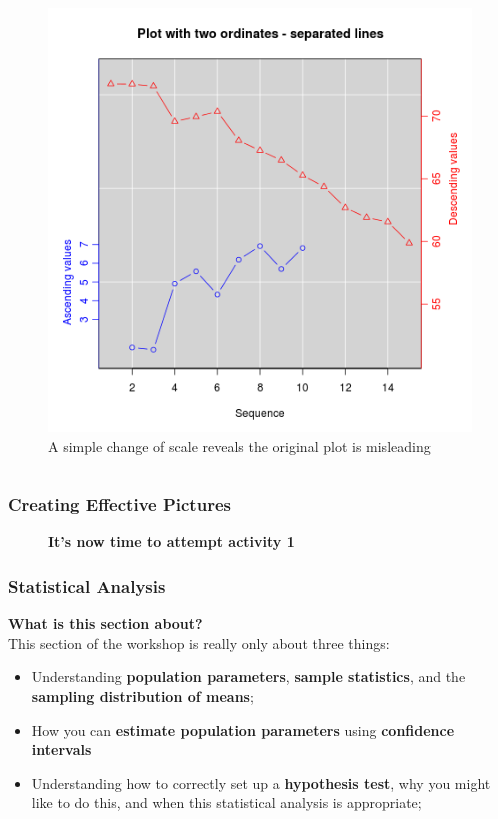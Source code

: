 \documentclass{beamer}
\begin{document}
\begin{frame}
\begin{columns}
\begin{figure}
\includegraphics[scale=0.2]{2plot_2}
\vspace{-0.3cm}
\caption{A simple change of scale reveals the original plot is misleading}
\end{figure}
\end{columns}
\end{frame}


\begin{frame}
\frametitle{Creating Effective Pictures}
\begin{figure}
\large\textbf{It's now time to attempt activity 1}
\end{figure}
\end{frame}

\begin{frame}
\frametitle{Statistical Analysis}
\textbf{What is this section about?}\\
\vspace{0.5cm}
This section of the workshop is really only about three things:
\vspace{0.4cm}
\begin{itemize}
\item Understanding \textbf{population parameters}, \textbf{sample statistics}, and the \textbf{sampling distribution of means};
\vspace{0.4cm}
\item How you can \textbf{estimate population parameters} using \textbf{confidence intervals}
\vspace{0.4cm}
\item Understanding how to correctly set up a \textbf{hypothesis test}, why you might like to do this, and when this statistical analysis is appropriate;
\end{itemize}
\end{frame}
\end{document}
